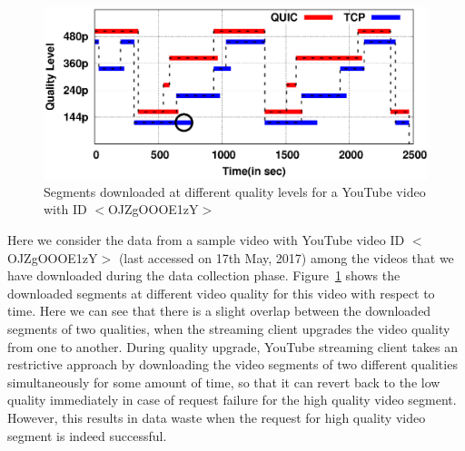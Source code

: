 %		
\begin{figure}[!t]
\centering
\includegraphics[width=0.7\linewidth]{img/plotdata/video/plot_timerange}
\caption{Segments downloaded at different quality levels for a YouTube video with ID $<$OJZgOOOE1zY$>$}
\label{fig:plot_timerange}
\end{figure}

Here we consider the data from a sample video with YouTube video ID $<$OJZgOOOE1zY$>$  (last accessed on 17th May, 2017) among the videos that we have downloaded during the data collection phase. Figure~\ref{fig:plot_timerange} shows the downloaded segments at different video quality for this video with respect to time. 
Here we can see that there is a slight overlap between the downloaded segments of two qualities, when the streaming client upgrades the video quality from one to another. During quality upgrade, YouTube streaming client takes an restrictive approach by downloading the video segments of two different qualities simultaneously for some amount of time, so that it can revert back to the low quality immediately in case of request failure for the high quality video segment. %
However, this results in data waste when the request for high quality video segment is indeed successful. 

